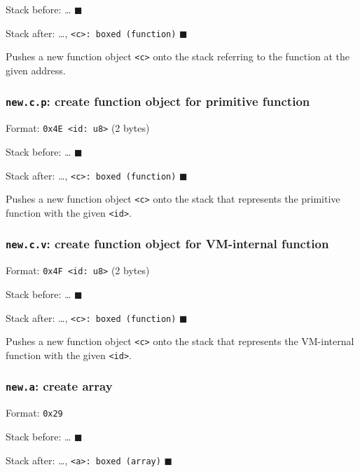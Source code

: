 Stack before: \ldots{} \(\blacksquare\)

Stack after: \ldots,
\texttt{\textless{}c\textgreater{}:\ boxed\ (function)} \(\blacksquare\)

Pushes a new function object \texttt{\textless{}c\textgreater{}} onto
the stack referring to the function at the given address.

\subsubsection{\texorpdfstring{\texttt{new.c.p}: create function object
for primitive
function}{new.c.p: create function object for primitive function}}

Format: \texttt{0x4E\ \textless{}id:\ u8\textgreater{}} (2 bytes)

Stack before: \ldots{} \(\blacksquare\)

Stack after: \ldots,
\texttt{\textless{}c\textgreater{}:\ boxed\ (function)} \(\blacksquare\)

Pushes a new function object \texttt{\textless{}c\textgreater{}} onto
the stack that represents the primitive function with the given
\texttt{\textless{}id\textgreater{}}.

\subsubsection{\texorpdfstring{\texttt{new.c.v}: create function object
for VM-internal
function}{new.c.v: create function object for VM-internal function}}

Format: \texttt{0x4F\ \textless{}id:\ u8\textgreater{}} (2 bytes)

Stack before: \ldots{} \(\blacksquare\)

Stack after: \ldots,
\texttt{\textless{}c\textgreater{}:\ boxed\ (function)} \(\blacksquare\)

Pushes a new function object \texttt{\textless{}c\textgreater{}} onto
the stack that represents the VM-internal function with the given
\texttt{\textless{}id\textgreater{}}.

\subsubsection{\texorpdfstring{\texttt{new.a}: create
array}{new.a: create array}}

Format: \texttt{0x29}

Stack before: \ldots{} \(\blacksquare\)

Stack after: \ldots,
\texttt{\textless{}a\textgreater{}:\ boxed\ (array)} \(\blacksquare\)

